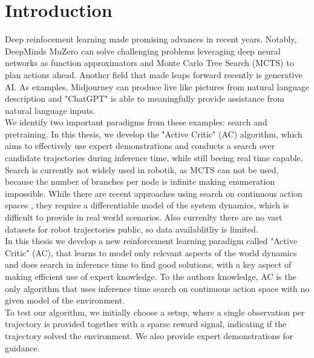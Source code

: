 \chapter{Introduction}
\label{chapter:Introduction}
Deep reinfocement learning made promising advances in recent years. Notably, DeepMinds MuZero \cite{MUZero} can solve challenging problems leveraging deep neural networks as function approximators and 
Monte Carlo Tree Search (MCTS) to plan actions ahead. Another field that made leaps forward recently is generative AI. As examples, Midjourney \cite{midjourney} 
can produce live like pictures from natural 
language description and "ChatGPT" is able to meaningfully provide assistance from natural language inputs. \\
We identify two important paradigms from these examples: search and pretraining. In this thesis, we develop the "Active Critic" (AC) algorithm, which aims to effectively use 
expert demonstrations and conducts a search over candidate trajectories during inference time, while still beeing real time capable.\\
Search is currently not widely used in robotik, as MCTS can not be used, because the number of branches per node is infinite making enumeration impossible. While there are recent approaches 
using search on continuous action spaces \cite{Manna2022} \cite{Lee_Jeon_Kim_Kim_2020}, they require a differentiable model of the system dynamics, which is difficult to provide in real world scenarios. 
Also currenlty there are no vast datasets for robot trajectories public, so data availablitliy is limited.\\ 
In this thesis we develop a new reinforcement learning 
paradigm called "Active Critic" (AC), that learns to model only relevant aspects of the world dynamics and does search in inference time to find good solutions, with a key aspect 
of making efficient use of expert knowledge. To the authors knowledge, AC is the only algorithm that uses inference time search on continuous action space with no given model of the environment.\\

To test our algorithm, we initially choose a setup, where a single observation per trajectory is provided together with a sparse reward signal, 
indicating if the trajectory solved the environment. We also provide expert demonstrations for guidance. \\

